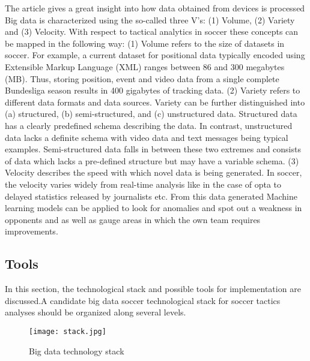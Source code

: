 \documentclass[sigconf]{acmart}
\begin{document}
The article \cite{Rein2016} gives a great insight into how data obtained from devices is processed Big data is characterized using the so-called three V’s: (1) Volume, (2) Variety and (3) Velocity. With respect to tactical analytics in soccer these concepts can be mapped in the following way:\newline
(1) Volume refers to the size of datasets in soccer. For example, a current dataset for positional data typically encoded using Extensible Markup Language (XML) ranges between 86 and 300 megabytes (MB). Thus, storing position, event and video data from a single complete Bundesliga season results in 400 gigabytes of tracking data\cite{Rein2016}.\newline
(2) Variety refers to different data formats and data sources. Variety can be further distinguished into (a) structured, (b) semi-structured, and (c) unstructured data. Structured data has a clearly predefined schema describing the data. In contrast, unstructured data lacks a definite schema with video data and text messages being typical examples. Semi-structured data falls in between these two extremes and consists of data which lacks a pre-defined structure but may have a variable schema\cite{Rein2016}. \newline
(3) Velocity describes the speed with which novel data is being generated. In soccer, the velocity varies widely from real-time analysis like in the case of opta to delayed statistics released by journalists etc\cite{Rein2016}.
From this data generated Machine learning models can be applied to look for anomalies and spot out a weakness in opponents and as well as gauge areas in which the own team requires improvements.


\subsection{Tools}

In this section, the technological stack and possible tools for implementation are discussed.A candidate big data soccer technological stack for soccer tactics analyses should be organized along several levels.

\begin{figure}[H]
    \texttt{[image: stack.jpg]}
    \caption{Big data technology stack}
    \label{Fig:1}
    \cite{Rein2016}
\end{figure}
\end{document}
